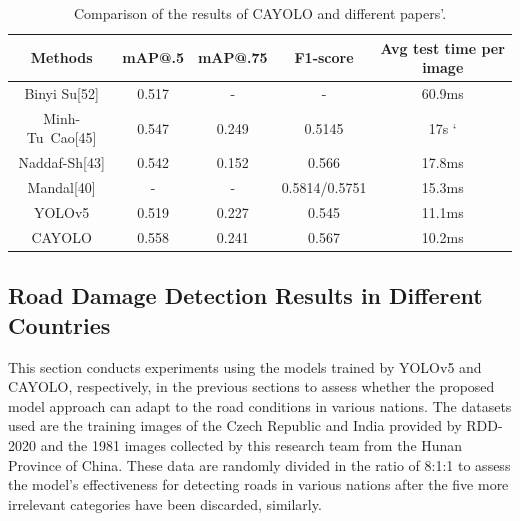 \documentclass[sensors,article,submit,moreauthors]{Definitions/mdpi}
\begin{document}
    \begin{table}[H]
        \caption{Comparison of the results of CAYOLO and different papers'.\label{tab:4}}
        \begin{tabularx}{\textwidth}{CCCCC}
            \toprule
            \textbf{Methods}       & \textbf{mAP@.5} & \textbf{mAP@.75} & \textbf{F1-score} & \textbf{Avg test time per image} \\
            \midrule
            Binyi Su[52]           & 0.517           & -                & -                 & 60.9ms                           \\
            \mbox{Minh-Tu Cao[45]} & 0.547           & 0.249            & 0.5145            & 17s `                             \\
            Naddaf-Sh[43]          & 0.542           & 0.152            & 0.566             & 17.8ms                           \\
            Mandal[40]             & -               & -                & 0.5814/0.5751     & 15.3ms                           \\
            YOLOv5                 & 0.519           & 0.227            & 0.545             & 11.1ms                           \\
            CAYOLO                 & 0.558           & 0.241            & 0.567             & 10.2ms                           \\
            \bottomrule
        \end{tabularx}
    \end{table}

    \subsection{Road Damage Detection Results in Different Countries}

    This section conducts experiments using the models trained by YOLOv5 and CAYOLO, respectively, in the previous sections to assess whether the proposed model approach can adapt to the road conditions in various nations. The datasets used are the training images of the Czech Republic and India provided by RDD-2020 and the 1981 images collected by this research team from the Hunan Province of China. These data are randomly divided in the ratio of 8:1:1 to assess the model's effectiveness for detecting roads in various nations after the five more irrelevant categories have been discarded, similarly.
\end{document}
